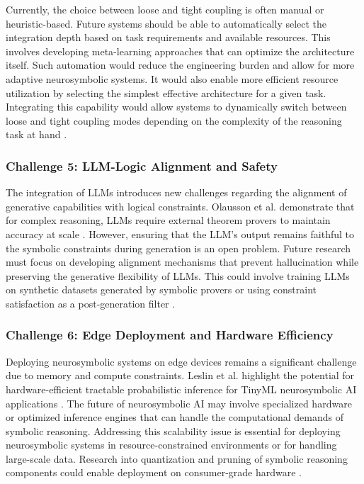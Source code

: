 \documentclass{article}
\begin{document}
\label{sec:challenge_4_automated_integration_depth_}

Currently, the choice between loose and tight coupling is often manual or heuristic-based. Future systems should be able to automatically select the integration depth based on task requirements and available resources. This involves developing meta-learning approaches that can optimize the architecture itself. Such automation would reduce the engineering burden and allow for more adaptive neurosymbolic systems. It would also enable more efficient resource utilization by selecting the simplest effective architecture for a given task. Integrating this capability would allow systems to dynamically switch between loose and tight coupling modes depending on the complexity of the reasoning task at hand \cite{bekkum2021modular}.

\subsubsection{Challenge 5: LLM-Logic Alignment and Safety}

\label{sec:challenge_5_llm_logic_alignment_and_safe}

The integration of LLMs introduces new challenges regarding the alignment of generative capabilities with logical constraints. Olausson et al. demonstrate that for complex reasoning, LLMs require external theorem provers to maintain accuracy at scale \cite{olausson2023linc}. However, ensuring that the LLM's output remains faithful to the symbolic constraints during generation is an open problem. Future research must focus on developing alignment mechanisms that prevent hallucination while preserving the generative flexibility of LLMs. This could involve training LLMs on synthetic datasets generated by symbolic provers or using constraint satisfaction as a post-generation filter \cite{gao2023retrievalaugmented}.

\subsubsection{Challenge 6: Edge Deployment and Hardware Efficiency}

\label{sec:challenge_6_edge_deployment_and_hardware}

Deploying neurosymbolic systems on edge devices remains a significant challenge due to memory and compute constraints. Leslin et al. highlight the potential for hardware-efficient tractable probabilistic inference for TinyML neurosymbolic AI applications \cite{leslin2025hardwareefficient}. The future of neurosymbolic AI may involve specialized hardware or optimized inference engines that can handle the computational demands of symbolic reasoning. Addressing this scalability issue is essential for deploying neurosymbolic systems in resource-constrained environments or for handling large-scale data. Research into quantization and pruning of symbolic reasoning components could enable deployment on consumer-grade hardware \cite{sander2025accelerating}.
\end{document}
